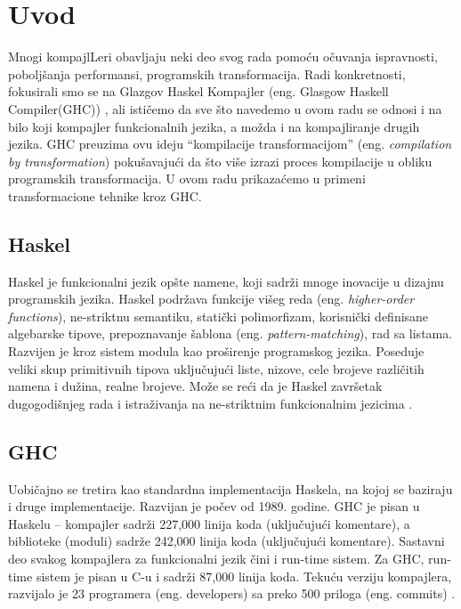\section{Uvod}
\label{sec:uvod}

Mnogi kompajlLeri obavljaju neki deo svog rada pomoću očuvanja ispravnosti, poboljšanja performansi, programskih transformacija. Radi konkretnosti, fokusirali smo se na Glazgov Haskel Kompajler (eng. Glasgow Haskell Compiler(GHC)) \cite{GHCxx}, ali ističemo da sve što navedemo u ovom radu se odnosi i na bilo koji kompajler funkcionalnih jezika, a možda i na kompajliranje drugih jezika. GHC preuzima ovu ideju “kompilacije transformacijom” (eng. \emph{compilation by transformation}) pokušavajući da što više izrazi proces kompilacije u obliku programskih transformacija. U ovom radu prikazaćemo u primeni transformacione tehnike kroz GHC.

\subsection{Haskel}
\label{subsec:podnaslovHaskel}
Haskel je funkcionalni jezik opšte namene, koji sadrži mnoge inovacije u dizajnu programskih jezika. Haskel podržava funkcije višeg reda (eng. \emph{ higher-order functions}), ne-striktnu semantiku, statički polimorfizam, korisnički definisane algebarske tipove, prepoznavanje šablona (eng. \emph{ pattern-matching}), rad sa listama. Razvijen je kroz sistem modula kao proširenje programskog jezika. Poseduje veliki skup primitivnih tipova uključujući liste, nizove, cele brojeve različitih namena i dužina, realne brojeve. Može se reći da je Haskel završetak dugogodišnjeg rada i istraživanja na ne-striktnim funkcionalnim jezicima \cite{Has10}. 

\subsection{GHC}
\label{subsec:podnaslovGHC}

Uobičajno se tretira kao standardna implementacija Haskela, na kojoj se baziraju i druge implementacije. Razvijan je počev od 1989. godine. GHC je pisan u Haskelu – kompajler sadrži 227,000 linija koda (uključujući komentare), a biblioteke (moduli) sadrže 242,000 linija koda (uključujući komentare). Sastavni deo svakog kompajlera za funkcionalni jezik čini i run-time sistem. Za GHC, run-time sistem je pisan u C-u i sadrži 87,000 linija koda. Tekuću verziju kompajlera, razvijalo je 23 programera (eng. developers) sa preko 500 priloga (eng. commits) \cite{StanfordGHC}.  



